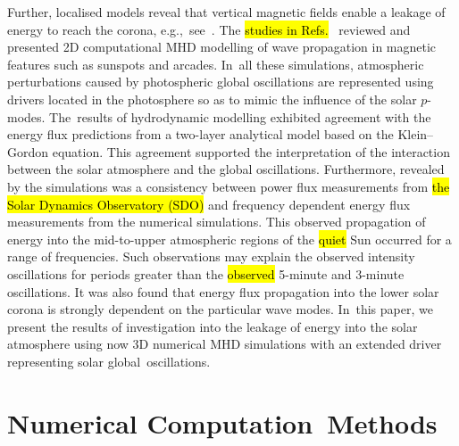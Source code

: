 \documentclass[physics,article,accept,pdftex,moreauthors]{Definitions/mdpi}
\begin{document}




Further, localised models reveal that vertical magnetic fields enable a leakage of energy to reach the corona, 
e.g.,~see~\cite{Khomenko2013,Santamaria2015}.   The %
 \hl{studies in Refs.}~\cite{Khomenko2013,Santamaria2015} reviewed and presented 2D computational MHD modelling of wave propagation in magnetic features such as sunspots and arcades.  In~all these simulations, atmospheric perturbations caused by photospheric global oscillations are represented using drivers located in the photosphere so as to mimic the influence of the solar $p$-modes. The~results of hydrodynamic modelling exhibited agreement  with the energy flux predictions from a two-layer analytical model based on the Klein--Gordon equation. This agreement supported the interpretation of the interaction between the solar atmosphere and the global oscillations. Furthermore, revealed by the simulations  was a consistency between power flux measurements 
from 
\hl{the Solar Dynamics Observatory 
(SDO)} 
and frequency dependent energy flux measurements from the numerical simulations. This observed propagation of energy into the mid-to-upper atmospheric regions of the 
\hl{quiet} %
Sun occurred for a range of frequencies. Such observations may explain the observed intensity oscillations for periods greater than the 
\hl{observed} %
5-minute and 3-minute oscillations. It was also found that energy flux propagation into the lower solar corona is strongly dependent on the particular wave modes. In~this paper, we present the results of investigation into the leakage of energy into the solar atmosphere using now 3D numerical MHD simulations with an extended driver representing solar global~oscillations. 







\section{Numerical Computation~Methods}
\end{document}
